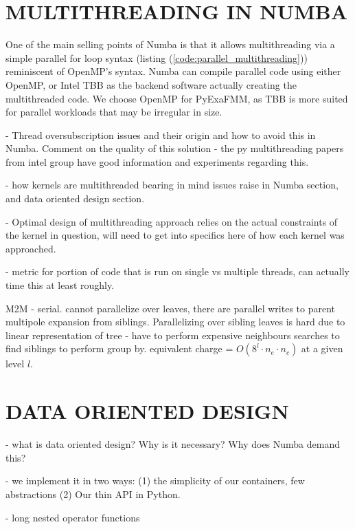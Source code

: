\documentclass{IEEEcsmag}
\begin{document}
\section{MULTITHREADING IN NUMBA}

One of the main selling points of Numba is that it allows multithreading via a simple parallel for loop syntax (listing (\ref{code:parallel_multithreading})) reminiscent of OpenMP's syntax. Numba can compile parallel code using either OpenMP, or Intel TBB as the backend software actually creating the multithreaded code. We choose OpenMP for PyExaFMM, as TBB is more suited for parallel workloads that may be irregular in size. 

- Thread oversubscription issues and their origin and how to avoid this in Numba. Comment on the quality of this solution - the py multithreading papers from intel group have good information and experiments regarding this.

- how kernels are multithreaded bearing in mind issues raise in Numba section, and data oriented design section.

- Optimal design of multithreading approach relies on the actual constraints of the kernel in question, will need to get into specifics here of how each kernel was approached.

- metric for portion of code that is run on single vs multiple threads, can actually time this at least roughly.

M2M
- serial. cannot parallelize over leaves, there are parallel writes to parent multipole expansion from siblings. Parallelizing over sibling leaves is hard due to linear representation of tree - have to perform expensive neighbours searches to find siblings to perform group by. equivalent charge = $O(8^l \cdot n_e \cdot n_c)$ at a given level $l$.



\section{DATA ORIENTED DESIGN}

- what is data oriented design? Why is it necessary? Why does Numba demand this?

- we implement it in two ways: (1) the simplicity of our containers, few abstractions (2) Our thin API in Python.

- long nested operator functions
\end{document}
